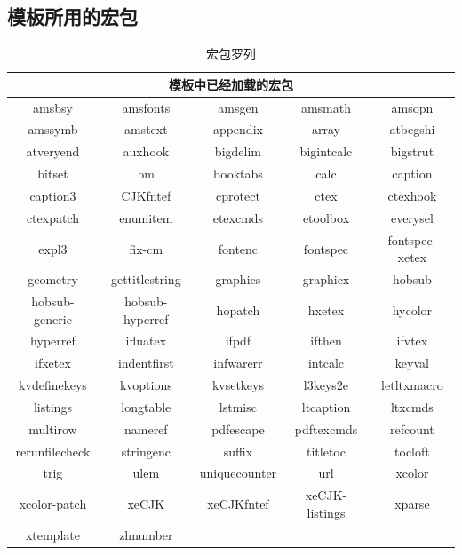 \documentclass{cumcmthesis}
\begin{document}
\newpage
\begin{appendices}

\section{模板所用的宏包}
\begin{table}[htbp]
    \centering
    \caption{宏包罗列}
    \begin{tabular}{ccccc}
        \toprule
        \multicolumn{5}{c}{模板中已经加载的宏包} \\
        \midrule
        amsbsy & amsfonts & {amsgen} & {amsmath} & {amsopn} \\
        amssymb & amstext & {appendix} & {array} & {atbegshi} \\
        atveryend & auxhook & {bigdelim} & {bigintcalc} & {bigstrut} \\
        bitset & bm    & {booktabs} & {calc} & {caption} \\
        caption3 & CJKfntef & {cprotect} & {ctex} & {ctexhook} \\
        ctexpatch & enumitem & {etexcmds} & {etoolbox} & {everysel} \\
        expl3 & fix-cm & {fontenc} & {fontspec} & {fontspec-xetex} \\
        geometry & gettitlestring & {graphics} & {graphicx} & {hobsub} \\
        hobsub-generic & hobsub-hyperref & {hopatch} & {hxetex} & {hycolor} \\
        hyperref & ifluatex & {ifpdf} & {ifthen} & {ifvtex} \\
        ifxetex & indentfirst & {infwarerr} & {intcalc} & {keyval} \\
        kvdefinekeys & kvoptions & {kvsetkeys} & {l3keys2e} & {letltxmacro} \\
        listings & longtable & {lstmisc} & {ltcaption} & {ltxcmds} \\
        multirow & nameref & {pdfescape} & {pdftexcmds} & {refcount} \\
        rerunfilecheck & stringenc & {suffix} & {titletoc} & {tocloft} \\
        trig  & ulem  & {uniquecounter} & {url} & {xcolor} \\
        xcolor-patch & xeCJK & {xeCJKfntef} & {xeCJK-listings} & {xparse} \\
        xtemplate & zhnumber &       &       &  \\
        \bottomrule
    \end{tabular}%
    \label{tab:addlabel}%
\end{table}%


\end{appendices}
\end{document}
